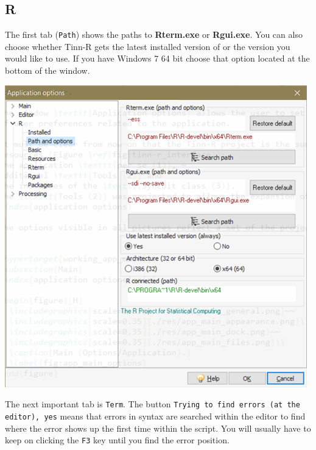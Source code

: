 \subsection{R}

The first tab (\texttt{Path}) shows the paths to \textbf{Rterm.exe} or \textbf{Rgui.exe}.
You can also choose whether Tinn-R gets the latest installed version of \RR{} or the version you would like to use.
If you have Windows 7 64 bit choose that option located at the bottom of the window.

\vspace{5mm}
\includegraphics[scale=0.8]{./res/app_r_pathandoptions.png}\\
\vspace{5mm}

The next important tab is \texttt{Term}. The button \texttt{Trying to find errors (at the editor), yes}
means that errors in \RR{} syntax are searched within the editor to find where the error shows up the first
time within the script. You will usually have to keep on clicking the \texttt{F3} key until you find the error position.

